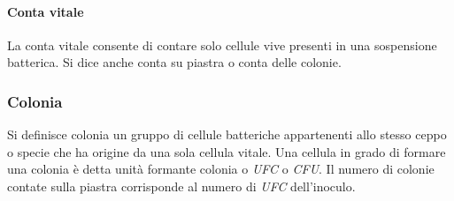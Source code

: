 			\paragraph{Conta vitale}
			La conta vitale consente di contare solo cellule vive presenti in una sospensione batterica.
			Si dice anche conta su piastra o conta delle colonie.

		\subsubsection{Colonia}
		Si definisce colonia un gruppo di cellule batteriche appartenenti allo stesso ceppo o specie che ha origine da una sola cellula vitale.
		Una cellula in grado di formare una colonia \`e detta unit\`a formante colonia o \emph{UFC} o \emph{CFU}.
		Il numero di colonie contate sulla piastra corrisponde al numero di \emph{UFC} dell'inoculo.

